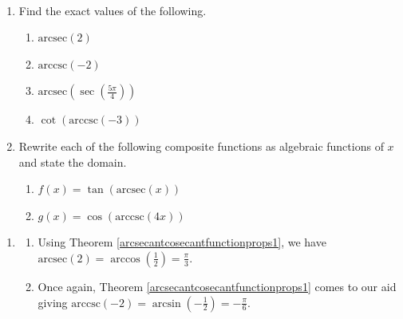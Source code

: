 \documentclass{ximera}
\begin{document}
\begin{example}  \label{arcsecantcosecantex1} $~$

\begin{enumerate}

\item  Find the exact values of the following.

\begin{enumerate}

\item $\text{arcsec}(2)$

\item  $\text{arccsc}(-2)$

\item  $\text{arcsec}\left( \sec\left( \frac{5\pi}{4} \right) \right)$

\item  $\cot\left(\text{arccsc}\left(-3\right)\right)$

\end{enumerate}

\item   Rewrite each of the following composite functions as algebraic functions of $x$ and state the domain.

\begin{enumerate}

\item \label{tangentofarcsecantexample} $f(x)  = \tan(\text{arcsec}(x))$

\item \label{cosineofarccosecantexample} $g(x) = \cos(\text{arccsc}(4x))$ 

\end{enumerate}

\end{enumerate}

\begin{explanation}

\begin{enumerate}

\item

\begin{enumerate}

\item Using Theorem \ref{arcsecantcosecantfunctionprops1}, we have $\text{arcsec}(2) = \arccos\left(\frac{1}{2}\right) = \frac{\pi}{3}$.

\item  Once again, Theorem \ref{arcsecantcosecantfunctionprops1} comes to our aid giving $\text{arccsc}(-2) = \arcsin\left(-\frac{1}{2}\right) = -\frac{\pi}{6}$.



\end{enumerate}
\end{enumerate}
\end{explanation}
\end{example}
\end{document}

